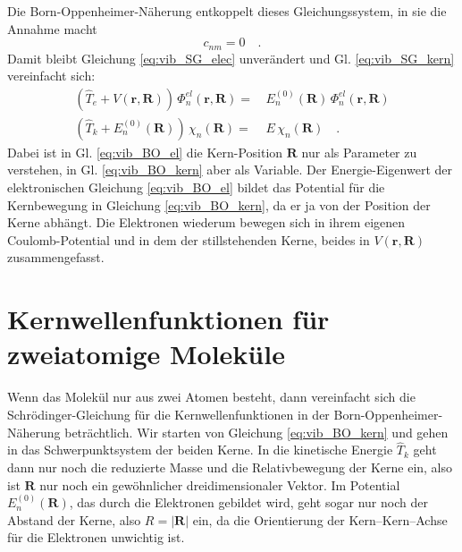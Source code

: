 Die Born-Oppenheimer-Näherung entkoppelt dieses Gleichungssystem, in sie die Annahme macht
\begin{equation}
c_{n m } = 0 \quad .
\end{equation}
Damit bleibt Gleichung \ref{eq:vib_SG_elec} unverändert und Gl. \ref{eq:vib_SG_kern} vereinfacht sich:
\begin{align}
\left( \hat{T}_e + V (\mathbf{r}, \mathbf{R}) \right) \, \Phi_n^{el}  (\mathbf{r}, \mathbf{R})  = &  \, E_n^{(0)}  (\mathbf{R})  \, \Phi_n^{el}  (\mathbf{r}, \mathbf{R})    \label{eq:vib_BO_el}\\
\left( \hat{T}_k + E_n^{(0)}(\mathbf{R})  \right) \, \chi_n (\mathbf{R}) =  &   \, E  \, \chi_n (\mathbf{R})  \quad .  \label{eq:vib_BO_kern}
\end{align}
Dabei ist in Gl. \ref{eq:vib_BO_el} die Kern-Position $\mathbf{R}$ nur als Parameter zu verstehen, in Gl. \ref{eq:vib_BO_kern} aber als Variable. Der Energie-Eigenwert der elektronischen Gleichung \ref{eq:vib_BO_el}  bildet das Potential für die Kernbewegung in Gleichung  \ref{eq:vib_BO_kern}, da er ja von der Position der Kerne abhängt. Die Elektronen wiederum bewegen sich in ihrem eigenen Coulomb-Potential und in dem der stillstehenden Kerne, beides in 
$V (\mathbf{r}, \mathbf{R}) $ zusammengefasst.


\section{Kernwellenfunktionen für zweiatomige Moleküle}

Wenn das Molekül nur aus zwei Atomen besteht, dann vereinfacht sich die Schrödinger-Gleichung für die Kernwellenfunktionen in der Born-Oppenheimer-Näherung beträchtlich. Wir starten von Gleichung \ref{eq:vib_BO_kern} und gehen in das Schwerpunktsystem der beiden Kerne. In die kinetische Energie $\hat{T}_k$ geht dann nur noch die reduzierte Masse und die Relativbewegung der Kerne ein, also ist $\mathbf{R}$ nur noch ein gewöhnlicher dreidimensionaler Vektor. Im Potential $ E_n^{(0)}(\mathbf{R})  $, das durch die Elektronen gebildet wird, geht sogar nur noch der Abstand der Kerne, also $R = |\mathbf{R}| $ ein, da die Orientierung der Kern--Kern--Achse für die Elektronen unwichtig ist. 

